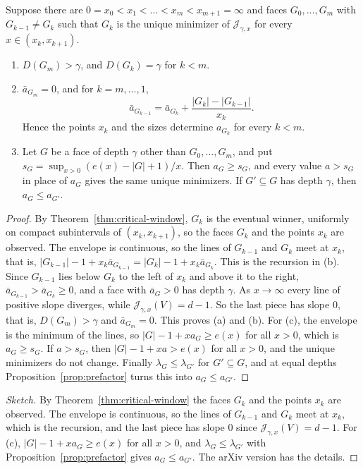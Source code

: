 \begin{theorem}\label{thm:window-prefactors}
Suppose there are $0=x_0<x_1<\dots<x_m<x_{m+1}=\infty$ and faces $G_0,\dots,G_m$
with $G_{k-1}\ne G_k$ such that $G_k$ is the unique minimizer of $\mathcal J_{\gamma,x}$
for every $x\in(x_k,x_{k+1})$.
\begin{enumerate}
\item[(a)] $D(G_m)>\gamma$, and $D(G_k)=\gamma$ for $k<m$.
\item[(b)] $\bar a_{G_m}=0$, and for $k=m,\dots,1$,
\[
 \bar a_{G_{k-1}}=\bar a_{G_k}+\frac{|G_k|-|G_{k-1}|}{x_k}.
\]
Hence the points $x_k$ and the sizes determine $a_{G_k}$ for every $k<m$.
\item[(c)] Let $G$ be a face of depth $\gamma$ other than $G_0,\dots,G_m$, and put
$s_G=\sup_{x>0}(e(x)-|G|+1)/x$. Then $a_G\ge s_G$, and every value
$a>s_G$ in place of $a_G$ gives the same unique minimizers. If $G'\subseteq G$
has depth $\gamma$, then $a_G\le a_{G'}$.
\end{enumerate}
\end{theorem}

\ifarxivbuild
\begin{proof}
By Theorem~\ref{thm:critical-window}, $G_k$ is the eventual winner, uniformly on
compact subintervals of $(x_k,x_{k+1})$, so the faces $G_k$ and the points $x_k$
are observed. The envelope is continuous, so the lines of $G_{k-1}$ and $G_k$
meet at $x_k$, that is,
$|G_{k-1}|-1+x_k\bar a_{G_{k-1}}=|G_k|-1+x_k\bar a_{G_k}$. This is the recursion
in (b). Since $G_{k-1}$ lies below $G_k$ to the left of $x_k$ and above it to
the right, $\bar a_{G_{k-1}}>\bar a_{G_k}\ge0$, and a face with $\bar a_G>0$ has
depth $\gamma$. As $x\to\infty$ every line of positive slope diverges, while
$\mathcal J_{\gamma,x}(V)=d-1$. So the last piece has slope $0$, that is,
$D(G_m)>\gamma$ and $\bar a_{G_m}=0$. This proves (a) and (b). For (c), the
envelope is the minimum of the lines, so $|G|-1+xa_G\ge e(x)$ for all $x>0$,
which is $a_G\ge s_G$. If $a>s_G$, then $|G|-1+xa>e(x)$ for all $x>0$, and the unique
minimizers do not change. Finally $\lambda_G\le\lambda_{G'}$ for $G'\subseteq G$,
and at equal depths Proposition~\ref{prop:prefactor} turns this into
$a_G\le a_{G'}$.
\end{proof}
\else
\begin{proof}[Sketch]
By Theorem~\ref{thm:critical-window} the faces $G_k$ and the points $x_k$ are observed. The
envelope is continuous, so the lines of $G_{k-1}$ and $G_k$ meet at $x_k$, which is the
recursion, and the last piece has slope $0$ since $\mathcal J_{\gamma,x}(V)=d-1$. For (c),
$|G|-1+xa_G\ge e(x)$ for all $x>0$, and $\lambda_G\le\lambda_{G'}$ with
Proposition~\ref{prop:prefactor} gives $a_G\le a_{G'}$. The arXiv version has the details.
\end{proof}
\fi

